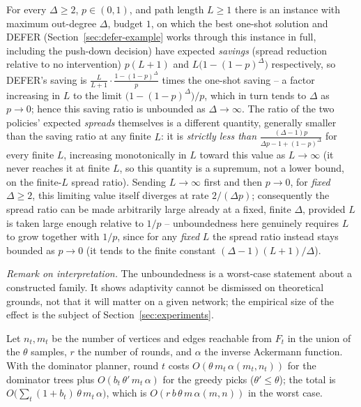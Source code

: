 \documentclass[ijoc,sglanonrev]{informs4}
\begin{document}
\begin{theorem}\label{thm:adaptivity-gap}
For every $\Delta\ge 2$, $p\in(0,1)$, and path length $L\ge1$ there is an
instance with maximum out-degree $\Delta$, budget $1$, on which the best
one-shot solution and DEFER (Section~\ref{sec:defer-example} works through
this instance in full, including the push-down decision) have expected
\emph{savings} (spread reduction relative to no intervention) $p(L+1)$ and
$L\bigl(1-(1-p)^\Delta\bigr)$ respectively, so DEFER's saving
is $\frac{L}{L+1}\cdot\frac{1-(1-p)^\Delta}{p}$ times the one-shot saving --
a factor increasing in $L$ to the limit $\bigl(1-(1-p)^\Delta\bigr)/p$,
which in turn tends to $\Delta$ as $p\to0$; hence this saving ratio is
unbounded as $\Delta\to\infty$. The ratio of the two policies' expected
\emph{spreads} themselves is a different quantity, generally smaller than
the saving ratio at any finite $L$: it is \emph{strictly less than}
$\frac{(\Delta-1)p}{\Delta p-1+(1-p)^\Delta}$ for every finite $L$,
increasing monotonically in $L$ toward this value as $L\to\infty$ (it never
reaches it at finite $L$, so this quantity is a supremum, not a lower
bound, on the finite-$L$ spread ratio). Sending $L\to\infty$ first and then
$p\to0$, for \emph{fixed} $\Delta\ge2$, this limiting value itself diverges
at rate $2/(\Delta p)$; consequently the spread ratio can be made
arbitrarily large already at a fixed, finite $\Delta$, provided $L$ is
taken large enough relative to $1/p$ -- unboundedness here genuinely
requires $L$ to grow together with $1/p$, since for any \emph{fixed} $L$
the spread ratio instead stays bounded as $p\to0$ (it tends to the finite
constant $(\Delta-1)(L+1)/\Delta$).
\end{theorem}

\emph{Remark on interpretation.} The unboundedness is a worst-case
statement about a constructed family. It shows adaptivity cannot be dismissed
on theoretical grounds, not that it will matter on a given network; the
empirical size of the effect is the subject of Section~\ref{sec:experiments}.

\begin{theorem}\label{thm:defer-complexity}
Let $n_t,m_t$ be the number of vertices and edges reachable from $F_t$ in
the union of the $\theta$ samples, $r$ the number of rounds, and $\alpha$
the inverse Ackermann function. With the dominator planner, round $t$ costs
$O(\theta\,m_t\,\alpha(m_t,n_t))$ for the dominator trees plus
$O(b_t\,\theta'\,m_t\,\alpha)$ for the greedy picks ($\theta'\le\theta$);
the total is $O\bigl(\sum_t(1+b_t)\,\theta\,m_t\,\alpha\bigr)$, which is
$O(r\,b\,\theta\,m\,\alpha(m,n))$ in the worst case.
\end{theorem}
\end{document}
